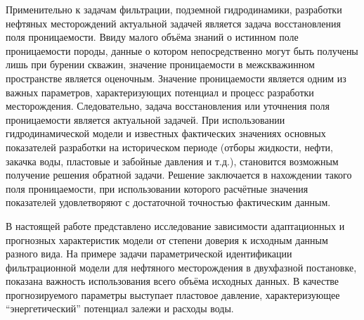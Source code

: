\documentclass{article}
\begin{document}
	Применительно к задачам фильтрации, подземной гидродинамики, разработки нефтяных месторождений актуальной задачей является задача восстановления поля проницаемости. Ввиду малого объёма знаний о истинном поле проницаемости породы, данные о котором непосредственно могут быть получены лишь при бурении скважин, значение проницаемости в межскважинном пространстве является оценочным. Значение проницаемости является одним из  важных параметров, характеризующих потенциал и процесс разработки месторождения. Следовательно, задача восстановления или уточнения поля проницаемости является актуальной задачей. При использовании гидродинамической модели и известных фактических значениях основных показателей разработки на историческом периоде (отборы жидкости, нефти, закачка воды, пластовые и забойные давления и т.д.), становится возможным получение решения обратной задачи. Решение заключается в нахождении такого поля проницаемости, при использовании которого расчётные значения показателей удовлетворяют с достаточной точностью фактическим данным.

	В настоящей работе представлено исследование зависимости адаптационных и прогнозных характеристик модели от степени доверия к исходным данным разного вида. На примере задачи параметрической идентификации фильтрационной модели для нефтяного месторождения в двухфазной постановке, показана важность использования всего объёма исходных данных. В качестве прогнозируемого параметры выступает пластовое давление, характеризующее “энергетический” потенциал залежи и расходы воды.
\end{document}
